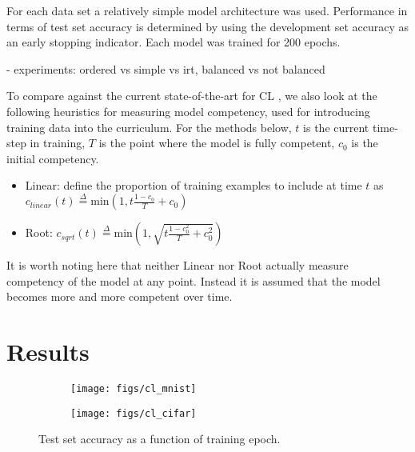\documentclass[letterpaper]{article} %
\begin{document}
For each data set a relatively simple model architecture was used.
Performance in terms of test set accuracy is determined by using the development set accuracy as an early stopping indicator.
Each model was trained for 200 epochs. 

- experiments: ordered vs simple vs irt, balanced vs not balanced

To compare against the current state-of-the-art for CL \cite{platanios_competence-based_2019}, we also look at the following heuristics for measuring model competency, used for introducing training data into the curriculum.
For the methods below, $t$ is the current time-step in training, $T$ is the point where the model is fully competent, $c_0$ is the initial competency. 

\begin{itemize}
	\item 
	Linear: define the proportion of training examples to include at time $t$ as $c_{linear}(t) \overset{\Delta}{=} \text{min} (1, t\frac{1-c_0}{T} + c_0)$
	\item 
	Root: $c_{sqrt}(t) \overset{\Delta}{=} \text{min}(1, \sqrt{t\frac{1-c_0^2}{T} + c_0^2})$
\end{itemize}

It is worth noting here that neither Linear nor Root actually measure competency of the model at any point. 
Instead it is assumed that the model becomes more and more competent over time.

\section{Results} 


\captionsetup[subfigure]{labelformat=empty}
\begin{figure*}[th!]
	\centering
	\begin{subfigure}[b]{0.45\textwidth}
		\centering
		\texttt{[image: figs/cl\_mnist]}
		\caption{\label{fig:cl_mnist}} 
		\vspace{-2em} 
	\end{subfigure} 
	\begin{subfigure}[b]{0.45\textwidth}
		\centering
		\texttt{[image: figs/cl\_cifar]}
		\caption{\label{fig:cl_cifar}} 
		\vspace{-2em} 
	\end{subfigure} 
	
	\caption{Test set accuracy as a function of training epoch.}
	\label{fig:acc_viz}
\end{figure*}
\end{document}
